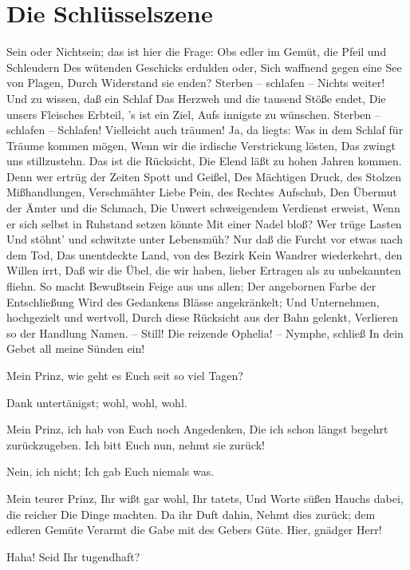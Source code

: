 \chapter{Die Schlüsselszene}

Sein oder Nichtsein; das ist hier die Frage:
Obs edler im Gemüt, die Pfeil und Schleudern
Des wütenden Geschicks erdulden oder,
Sich waffnend gegen eine See von Plagen,
Durch Widerstand sie enden? Sterben -- schlafen --
Nichts weiter! Und zu wissen, daß ein Schlaf
Das Herzweh und die tausend Stöße endet,
Die unsers Fleisches Erbteil, 's ist ein Ziel,
Aufs innigste zu wünschen. Sterben -- schlafen --
Schlafen! Vielleicht auch träumen! Ja, da liegts:
Was in dem Schlaf für Träume kommen mögen,
Wenn wir die irdische Verstrickung lösten,
Das zwingt uns stillzustehn. Das ist die Rücksicht,
Die Elend läßt zu hohen Jahren kommen.
Denn wer ertrüg der Zeiten Spott und Geißel,
Des Mächtigen Druck, des Stolzen Mißhandlungen,
Verschmähter Liebe Pein, des Rechtes Aufschub,
Den Übermut der Ämter und die Schmach,
Die Unwert schweigendem Verdienst erweist,
Wenn er sich selbst in Ruhstand setzen könnte
Mit einer Nadel bloß? Wer trüge Lasten
Und stöhnt' und schwitzte unter Lebensmüh?
Nur daß die Furcht vor etwas nach dem Tod,
Das unentdeckte Land, von des Bezirk
Kein Wandrer wiederkehrt, den Willen irrt,
Daß wir die Übel, die wir haben, lieber
Ertragen als zu unbekannten fliehn.
So macht Bewußtsein Feige aus uns allen;
Der angebornen Farbe der Entschließung
Wird des Gedankens Blässe angekränkelt;
Und Unternehmen, hochgezielt und wertvoll,
Durch diese Rücksicht aus der Bahn gelenkt,
Verlieren so der Handlung Namen. -- Still!
Die reizende Ophelia! -- Nymphe, schließ
In dein Gebet all meine Sünden ein!

Mein Prinz, wie geht es Euch seit so viel Tagen?

Dank untertänigst; wohl, wohl, wohl.

Mein Prinz, ich hab von Euch noch Angedenken,
Die ich schon längst begehrt zurückzugeben.
Ich bitt Euch nun, nehmt sie zurück!

Nein, ich nicht;
Ich gab Euch niemals was.

Mein teurer Prinz, Ihr wißt gar wohl, Ihr tatets,
Und Worte süßen Hauchs dabei, die reicher
Die Dinge machten. Da ihr Duft dahin,
Nehmt dies zurück; dem edleren Gemüte
Verarmt die Gabe mit des Gebers Güte.
Hier, gnädger Herr!

Haha! Seid Ihr tugendhaft?

